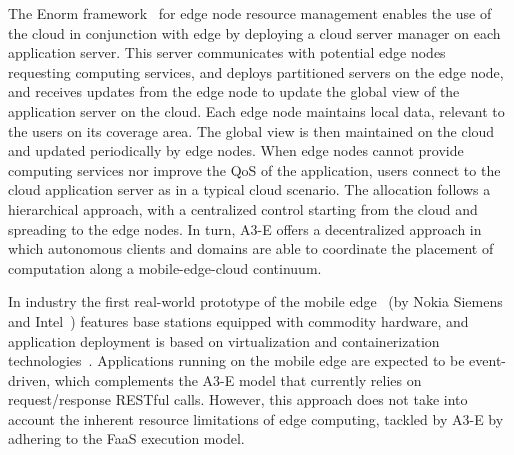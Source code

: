 
The Enorm framework~\cite{wang2017enorm} for edge node resource management enables the use of the cloud in conjunction with edge by deploying a cloud server manager on each application server. This server communicates with potential edge nodes requesting computing services, and deploys partitioned servers on the edge node, and receives updates from the edge node to update the global view of the application server on the cloud. Each edge node maintains local data, relevant to the users on its coverage area. The global view is then maintained on the cloud and updated periodically by edge nodes. When edge nodes cannot provide computing services nor improve the QoS of the application, users connect to the cloud application server as in a typical cloud scenario. The allocation follows a hierarchical approach, with a centralized control starting from the cloud and spreading to the edge nodes. In turn, A3-E offers a decentralized approach in which autonomous clients and domains are able to coordinate the placement of computation along a mobile-edge-cloud continuum. 



In industry the first real-world prototype of the mobile edge~\cite{beck2014mobile} (by Nokia Siemens and Intel~\cite{NokiaMEC13}) features base stations equipped with commodity hardware, and application deployment is based on virtualization and containerization technologies~\cite{ismail2015icos}. Applications running on the mobile edge are expected to be event-driven, which complements the A3-E model that currently relies on request/response RESTful calls. However, this approach does not take into account the inherent resource limitations of edge computing, tackled by A3-E by adhering to the FaaS execution model.


